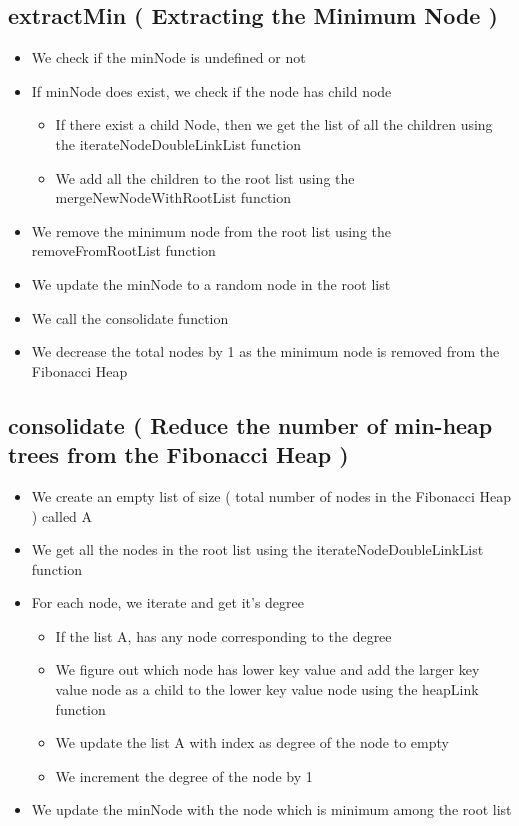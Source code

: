 \subsection{ extractMin ( Extracting the Minimum Node ) }
	\begin{itemize}
		\item We check if the minNode is undefined or not
		\item If minNode does exist, we check if the node has child node
			\begin{itemize}
			\item If there exist a child Node, then we get the list of all the children using the iterateNodeDoubleLinkList function
			\item We add all the children to the root list using the mergeNewNodeWithRootList function
			\end{itemize}
		\item We remove the minimum node from the root list using the removeFromRootList function
		\item We update the minNode to a random node in the root list
		\item We call the consolidate function 
		\item We decrease the total nodes by 1 as the minimum node is removed from the Fibonacci Heap
	\end{itemize}
	
\subsection{consolidate ( Reduce the number of min-heap trees from the Fibonacci Heap )}
		\begin{itemize}
			\item We create an empty list of size ( total number of nodes in the Fibonacci Heap ) called A
			\item We get all the nodes in the root list using the  iterateNodeDoubleLinkList function
			\item For each node, we iterate and get it's degree
			\begin{itemize}
				\item If the list A, has any node corresponding to the degree
				\item We figure out which node has lower key value and add the larger key value node as a child to the lower key value node using the heapLink function
				\item We update the list A with index as degree of the node to empty
				\item We increment the degree of the node by 1
			\end{itemize}
			\item We update the minNode with the node which is minimum among the root list
		\end{itemize}
